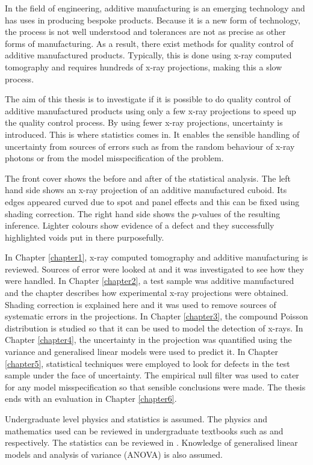 \documentclass[12pt, a4paper, oneside]{memoir}
\begin{document}
In the field of engineering, additive manufacturing is an emerging technology and has uses in producing bespoke products. Because it is a new form of technology, the process is not well understood and tolerances are not as precise as other forms of manufacturing. As a result, there exist methods for quality control of additive manufactured products. Typically, this is done using x-ray computed tomography and requires hundreds of x-ray projections, making this a slow process.

The aim of this thesis is to investigate if it is possible to do quality control of additive manufactured products using only a few x-ray projections to speed up the quality control process. By using fewer x-ray projections, uncertainty is introduced. This is where statistics comes in. It enables the sensible handling of uncertainty from sources of errors such as from the random behaviour of x-ray photons or from the model misspecification of the problem.

The front cover shows the before and after of the statistical analysis. The left hand side shows an x-ray projection of an additive manufactured cuboid. Its edges appeared curved due to spot and panel effects and this can be fixed using shading correction. The right hand side shows the $p$-values of the resulting inference. Lighter colours show evidence of a defect and they successfully highlighted voids put in there purposefully.

In Chapter \ref{chapter1}, x-ray computed tomography and additive manufacturing is reviewed. Sources of error were looked at and it was investigated to see how they were handled. In Chapter \ref{chapter2}, a test sample was additive manufactured and the chapter describes how experimental x-ray projections were obtained. Shading correction is explained here and it was used to remove sources of systematic errors in the projections. In Chapter \ref{chapter3}, the compound Poisson distribution is studied so that it can be used to model the detection of x-rays. In Chapter \ref{chapter4}, the uncertainty in the projection was quantified using the variance and generalised linear models were used to predict it. In Chapter \ref{chapter5}, statistical techniques were employed to look for defects in the test sample under the face of uncertainty. The empirical null filter was used to cater for any model misspecification so that sensible conclusions were made. The thesis ends with an evaluation in Chapter \ref{chapter6}.

Undergraduate level physics and statistics is assumed. The physics and mathematics used can be reviewed in undergraduate textbooks such as \cite{serway2018physics} and \cite{riley2006mathematical} respectively. The statistics can be reviewed in \cite{rice2009mathematical}. Knowledge of generalised linear models \citep{nelder1972generalized,nelder1972generalized_2, mccullagh1984generalized} and analysis of variance (ANOVA) is also assumed.
\end{document}
